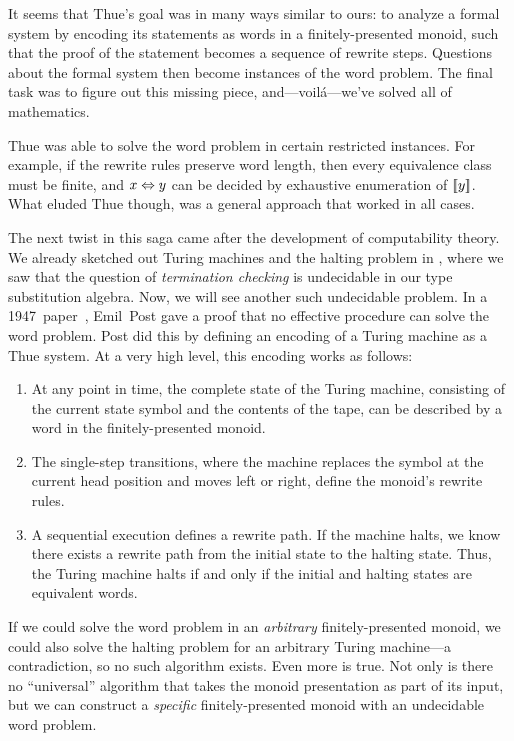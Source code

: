 \documentclass[../generics]{subfiles}
\begin{document}
It seems that Thue's goal was in many ways similar to ours: to analyze a formal system by encoding its statements as words in a finitely-presented monoid, such that the proof of the statement becomes a sequence of rewrite steps. Questions about the formal system then become instances of the word problem. The final task was to figure out this missing piece, and---voil\'a---we've solved all of mathematics.

Thue was able to solve the word problem in certain restricted instances. For example, if the rewrite rules preserve word length, then every equivalence class must be finite, and $x\Leftrightarrow y$ can be decided by exhaustive enumeration of $[\![y]\!]$. What eluded Thue though, was a general approach that worked in all cases.

The next twist in this saga came after the development of computability theory. We already sketched out Turing machines and the halting problem in , where we saw that the question of \emph{termination checking} is undecidable in our type substitution algebra. Now, we will see another such undecidable problem. In a 1947~paper~\cite{post_1947}, Emil~Post gave a proof that no effective procedure can solve the word problem. Post did this by defining an encoding of a Turing machine as a Thue system. At a very high level, this encoding works as follows:
\begin{enumerate}
\item At any point in time, the complete state of the Turing machine, consisting of the current state symbol and the contents of the tape, can be described by a word in the finitely-presented monoid.
\item The single-step transitions, where the machine replaces the symbol at the current head position and moves left or right, define the monoid's rewrite rules.
\item A sequential execution defines a rewrite path. If the machine halts, we know there exists a rewrite path from the initial state to the halting state. Thus, the Turing machine halts if and only if the initial and halting states are equivalent words.
\end{enumerate}
If we could solve the word problem in an \emph{arbitrary} finitely-presented monoid, we could also solve the halting problem for an arbitrary Turing machine---a contradiction, so no such algorithm exists. Even more is true. Not only is there no ``universal'' algorithm that takes the monoid presentation as part of its input, but we can construct a \emph{specific} finitely-presented monoid with an undecidable word problem.
\end{document}
